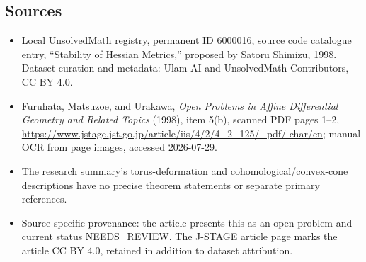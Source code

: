 \documentclass[11pt]{article}
\begin{document}
\subsection{Sources}
\begin{itemize}
\item Local UnsolvedMath registry, permanent ID 6000016, source code catalogue entry, ``Stability of Hessian Metrics,'' proposed by Satoru Shimizu, 1998. Dataset curation and metadata: Ulam AI and UnsolvedMath Contributors, CC BY 4.0.
\item Furuhata, Matsuzoe, and Urakawa, \emph{Open Problems in Affine Differential Geometry and Related Topics} (1998), item 5(b), scanned PDF pages 1--2, \url{https://www.jstage.jst.go.jp/article/iis/4/2/4_2_125/_pdf/-char/en}; manual OCR from page images, accessed 2026-07-29.
\item The research summary's torus-deformation and cohomological/convex-cone descriptions have no precise theorem statements or separate primary references.
\item Source-specific provenance: the article presents this as an open problem and current status NEEDS\_REVIEW. The J-STAGE article page marks the article CC BY 4.0, retained in addition to dataset attribution.
\end{itemize}
\end{document}
